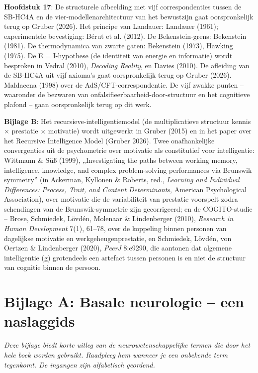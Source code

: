 \documentclass[11pt, twoside, openright]{book}
\begin{document}
\textbf{Hoofdstuk 17}: De structurele afbeelding met vijf correspondenties tussen de SB-HC4A en de vier-modellenarchitectuur van het bewustzijn gaat oorspronkelijk terug op Gruber (2026). Het principe van Landauer: Landauer (1961); experimentele bevestiging: Bérut et al. (2012). De Bekenstein-grens: Bekenstein (1981). De thermodynamica van zwarte gaten: Bekenstein (1973), Hawking (1975). De E = I-hypothese (de identiteit van energie en informatie) wordt besproken in Vedral (2010), \textit{Decoding Reality}, en Davies (2010). De afleiding van de SB-HC4A uit vijf axioma's gaat oorspronkelijk terug op Gruber (2026). Maldacena (1998) over de AdS/\allowbreak{}CFT-correspondentie. De vijf zwakke punten -- waaronder de bezwaren van onfalsifieerbaarheid-door-structuur en het cognitieve plafond -- gaan oorspronkelijk terug op dit werk.

\textbf{Bijlage B}: Het recursieve-intelligentiemodel (de multiplicatieve structuur kennis × prestatie × motivatie) wordt uitgewerkt in Gruber (2015) en in het paper over het Recursive Intelligence Model (Gruber 2026). Twee onafhankelijke convergenties uit de psychometrie over motivatie als constitutief voor intelligentie: Wittmann \& Süß (1999), „Investigating the paths between working memory, intelligence, knowledge, and complex problem-solving performances via Brunswik symmetry” (in Ackerman, Kyllonen \& Roberts, red., \textit{Learning and Individual Differences: Process, Trait, and Content Determinants}, American Psychological Association), over motivatie die de variabiliteit van prestatie voorspelt zodra schendingen van de Brunswik-symmetrie zijn gecorrigeerd; en de COGITO-studie -- Brose, Schmiedek, Lövdén, Molenaar \& Lindenberger (2010), \textit{Research in Human Development} 7(1), 61--78, over de koppeling binnen personen van dagelijkse motivatie en werkgeheugenprestatie, en Schmiedek, Lövdén, von Oertzen \& Lindenberger (2020), \textit{PeerJ} 8:e9290, die aantonen dat algemene intelligentie (g) grotendeels een artefact tussen personen is en niet de structuur van cognitie binnen de persoon.


\chapter*{Bijlage A: Basale neurologie -- een naslaggids}

\textit{Deze bijlage biedt korte uitleg van de neurowetenschappelijke termen die door het hele boek worden gebruikt. Raadpleeg hem wanneer je een onbekende term tegenkomt. De ingangen zijn alfabetisch geordend.}
\end{document}
